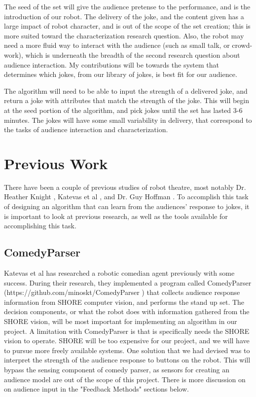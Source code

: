 \documentclass[onecolumn, draftclsnofoot,10pt, compsoc]{IEEEtran}
\begin{document}
The seed of the set will give the audience pretense to the performance, and is the introduction of our robot. The delivery of the joke, and the content given has a large impact of robot character, and is out of the scope of the set creation; this is more suited toward the characterization research question. Also, the robot may need a more fluid way to interact with the audience (such as small talk, or crowd-work), which is underneath the breadth of the second research question about audience interaction. My contributions will be towards the system that determines which jokes, from our library of jokes, is best fit for our audience.

The algorithm will need to be able to input the strength of a delivered joke, and return a joke with attributes that match the strength of the joke. This will begin at the seed portion of the algorithm, and pick jokes until the set has lasted 3-6 minutes. The jokes will have some small variability in delivery, that correspond to the tasks of audience interaction and characterization.

\section{Previous Work}
    There have been a couple of previous studies of robot theatre, most notably Dr. Heather Knight \cite{KnightEightLessons:2011}, Katevas et al \cite{KatevasRobot:2014}, and Dr. Guy Hoffman \cite{hoffman2010anticipation}. To accomplish this task of designing an algorithm that can learn from the audiences' response to jokes, it is important to look at previous research, as well as the tools available for accomplishing this task.
  \subsection{ComedyParser}
  Katevas et al \cite{KatevasRobot:2014} has researched a robotic comedian agent previously with some success. During their research, they implemented a program called ComedyParser (https://github.com/minoskt/ComedyParser ) that collects audience response information from SHORE computer vision, and performs the stand up set. The decision components, or what the robot does with information gathered from the SHORE vision, will be most important for implementing an algorithm in our project. 
  A limitation with ComedyParser is that is specifically needs the SHORE vision to operate. SHORE will be too expensive for our project, and we will have to pursue more freely available systems. One solution that we had devised was to interpret the strength of the audience response to buttons on the robot. This will bypass the sensing component of comedy parser, as sensors for creating an audience model are out of the scope of this project. There is more discussion on on audience input in the "Feedback Methods" sections below.
\end{document}
